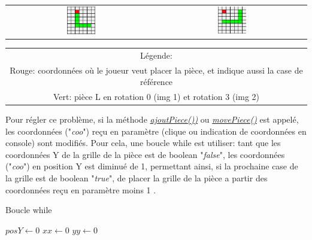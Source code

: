         \begin{table}[h]
            \centering
            \begin{tabular}{cc}\label{img:prblmPlacement}
                \includegraphics[width=0.20\textwidth, keepaspectratio]{img/pieceLrot0.png} & \includegraphics[width=0.20\textwidth, keepaspectratio]{img/pieceLrot3.png}\\
            \end{tabular}
            \begin{tabular}{c}
                Légende:\\
                Rouge: coordonnées où le joueur veut placer la pièce, et indique aussi la case de référence\\
                Vert: pièce L en rotation 0 (img 1) et rotation 3 (img 2)
            \end{tabular}
       \end{table}

       Pour régler ce problème, si la méthode \underline{\textit{ajoutPiece())}} ou \underline{\textit{movePiece()}} est appelé, les coordonnées ("\textit{coo}") reçu en paramètre (clique ou indication de coordonnées en console) sont modifiés. Pour cela, une boucle while est utiliser: tant que les coordonnées Y de la grille de la pièce est de boolean "\textit{false}", les coordonnées ("\textit{coo}") en position Y est diminué de 1, permettant ainsi, si la prochaine case de la grille est de boolean "\textit{true}", de placer la grille de la pièce a partir des coordonnées reçu en paramètre moins 1 .

       \begin{algorithm}[H]\label{alg:whilePlacementPiece}
		         \caption{Boucle while}
                 $posY \leftarrow 0$\;
                 $xx \leftarrow 0$\;
                 $yy \leftarrow 0$\;
			\end{algorithm}

